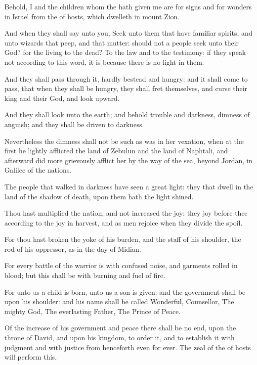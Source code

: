\Verse Behold, I and the children whom the \LORD hath given me are for signs and for wonders in Israel from the \LORD of hosts, which dwelleth in mount Zion.

\Verse And when they shall say unto you, Seek unto them that have familiar spirits, and unto wizards that peep, and that mutter: should not a people seek unto their God? for the living to the dead?  \Verse To the law and to the testimony: if they speak not according to this word, it is because there is no light in them.

\Verse And they shall pass through it, hardly bestead and hungry: and it shall come to pass, that when they shall be hungry, they shall fret themselves, and curse their king and their God, and look upward.

\Verse And they shall look unto the earth; and behold trouble and darkness, dimness of anguish; and they shall be driven to darkness.


\Chapter
\Verse Nevertheless the dimness shall not be such as was in her vexation, when at the first he lightly afflicted the land of Zebulun and the land of Naphtali, and afterward did more grievously afflict her by the way of the sea, beyond Jordan, in Galilee of the nations.

\Verse The people that walked in darkness have seen a great light: they that dwell in the land of the shadow of death, upon them hath the light shined.

\Verse Thou hast multiplied the nation, and not increased the joy: they joy before thee according to the joy in harvest, and as men rejoice when they divide the spoil.

\Verse For thou hast broken the yoke of his burden, and the staff of his shoulder, the rod of his oppressor, as in the day of Midian.

\Verse For every battle of the warrior is with confused noise, and garments rolled in blood; but this shall be with burning and fuel of fire.

\Verse For unto us a child is born, unto us a son is given: and the government shall be upon his shoulder: and his name shall be called Wonderful, Counsellor, The mighty God, The everlasting Father, The Prince of Peace.

\Verse Of the increase of his government and peace there shall be no end, upon the throne of David, and upon his kingdom, to order it, and to establish it with judgment and with justice from henceforth even for ever. The zeal of the \LORD of hosts will perform this.

